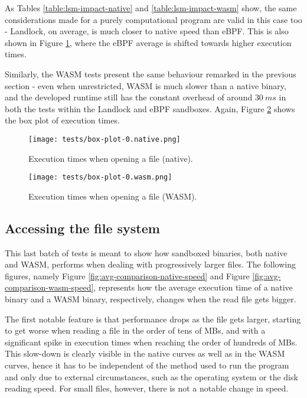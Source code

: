As Tables \ref{table:lsm-impact-native} and \ref{table:lsm-impact-wasm} show,
the same considerations made for a purely computational program are valid in this case too
- Landlock, on average, is much closer to native speed than eBPF.
This is also shown in Figure \ref{fig:distribution-opening-native}, where the eBPF average is shifted towards
higher execution times.

Similarly, the WASM tests present the same behaviour remarked in the previous section -
even when unrestricted, WASM is much slower than a native binary, and the developed runtime
still has the constant overhead of around $30\ ms$ in both the tests within the Landlock and eBPF sandboxes.
Again, Figure \ref{fig:distribution-opening-wasm} shows the box plot of execution times.

\begin{figure}[ht!]
  \centering
  \texttt{[image: tests/box-plot-0.native.png]}
  \caption{Execution times when opening a file (native).}
  \label{fig:distribution-opening-native}
\end{figure}

\begin{figure}[ht!]
  \centering
  \texttt{[image: tests/box-plot-0.wasm.png]}
  \caption{Execution times when opening a file (WASM).}
  \label{fig:distribution-opening-wasm}
\end{figure}

\subsection{Accessing the file system}

This last batch of tests is meant to show how sandboxed binaries, both native and WASM, performs when
dealing with progressively larger files.
The following figures, namely Figure \ref{fig:avg-comparison-native-speed} and Figure \ref{fig:avg-comparison-wasm-speed},
represents how the average execution time of a native binary and a WASM binary, respectively, changes
when the read file gets bigger.

The first notable feature is that performance drops as the file gets larger,
starting to get worse when reading a file in the order of tens of MBs, and with a significant
spike in execution times when reaching the order of hundreds of MBs.
This slow-down is clearly visible in the native curves as well as in the WASM curves,
hence it has to be independent of the method used to run the
program and only due to external circumstances, such as the operating system or the disk reading speed.
For small files, however, there is not a notable change in speed.

